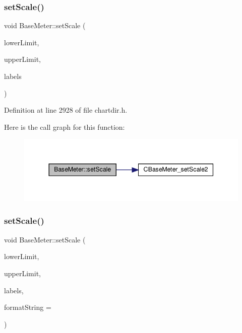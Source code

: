 \subsubsection{\texorpdfstring{set\+Scale()}{setScale()}\hspace{0.1cm}{\footnotesize\ttfamily [2/3]}}
{\footnotesize\ttfamily void Base\+Meter\+::set\+Scale (\begin{DoxyParamCaption}\item[{double}]{lower\+Limit,  }\item[{double}]{upper\+Limit,  }\item[{\hyperlink{class_string_array}{String\+Array}}]{labels }\end{DoxyParamCaption})\hspace{0.3cm}{\ttfamily [inline]}}



Definition at line 2928 of file chartdir.\+h.

Here is the call graph for this function\+:
\nopagebreak
\begin{figure}[H]
\begin{center}
\leavevmode
\includegraphics[width=344pt]{class_base_meter_a8b3b33dbe680f892ba3d860b579e727f_cgraph}
\end{center}
\end{figure}
\mbox{\label{class_base_meter_a5bb7919cb0a67c0b578620644d3dc4ae}} 
\subsubsection{\texorpdfstring{set\+Scale()}{setScale()}\hspace{0.1cm}{\footnotesize\ttfamily [3/3]}}
{\footnotesize\ttfamily void Base\+Meter\+::set\+Scale (\begin{DoxyParamCaption}\item[{double}]{lower\+Limit,  }\item[{double}]{upper\+Limit,  }\item[{\hyperlink{class_double_array}{Double\+Array}}]{labels,  }\item[{const char $\ast$}]{format\+String = {} }\end{DoxyParamCaption})\hspace{0.3cm}{\ttfamily [inline]}}



